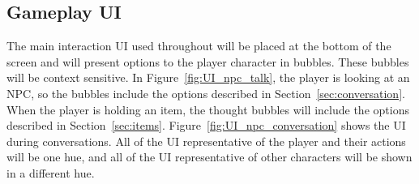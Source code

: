 \subsection{Gameplay UI}
\label{sec:UI_Gameplay}
The main interaction UI used throughout \ourgame{} will be placed at the bottom of the screen and will present options to the player character in bubbles. These bubbles will be context sensitive. In Figure~\ref{fig:UI_npc_talk}, the player is looking at an NPC, so the bubbles include the options described in Section~\ref{sec:conversation}. When the player is holding an item, the thought bubbles will include the options described in Section~\ref{sec:items}. Figure~\ref{fig:UI_npc_conversation} shows the UI during conversations. All of the UI representative of the player and their actions will be one hue, and all of the UI representative of other characters will be shown in a different hue.

